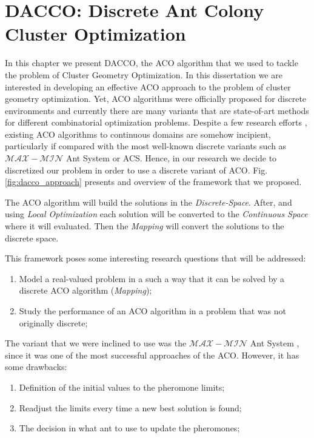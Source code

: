 \chapter{DACCO: Discrete Ant Colony Cluster Optimization}
\label{chap:approach}

In this chapter we present DACCO, the ACO algorithm that we used to tackle the problem of Cluster Geometry Optimization. In this dissertation we are interested in developing an effective ACO approach to the problem of cluster geometry optimization. Yet, ACO algorithms were officially proposed for discrete environments and currently there are many variants that are state-of-art methods for different combinatorial optimization problems. Despite a few research efforts \cite{bilchev95, kong06, socha04, tsutsui04}, existing ACO algorithms to continuous domains are somehow incipient, particularly if compared with the most well-known discrete variants such as $\mathcal{MAX}-\mathcal{MIN}$ Ant System or ACS. Hence, in our research we decide to discretized our problem in order to use a discrete variant of ACO. Fig. \ref{fig:dacco_approach} presents and overview of the framework that we proposed.  


The ACO algorithm will build the solutions in the \emph{Discrete-Space}. After, and using \emph{Local Optimization} each solution will be converted to the \emph{Continuous Space} where it will evaluated. Then the \emph{Mapping} will convert the solutions to the discrete space.

This framework poses some interesting research questions that will be addressed:
\begin{enumerate}
	\item Model a real-valued problem in a such a way that it can be solved by a discrete ACO algorithm (\emph{Mapping});
	\item Study the performance of an ACO algorithm in a problem that was not originally discrete;
\end{enumerate}

The variant that we were inclined to use was the $\mathcal{MAX}-\mathcal{MIN}$ Ant System \cite{stutzle00}, since it was one of the most successful approaches of the ACO.  However, it has some drawbacks:
\begin{enumerate}
	\item Definition of the initial values to the pheromone limits;
	\item Readjust the limits every time a new best solution is found; 
	\item The decision in what ant to use to update the pheromones;
\end{enumerate}

